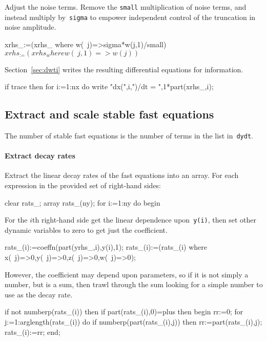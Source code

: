 \documentclass[11pt,a5paper]{article}
\begin{document}
Adjust the noise terms. Remove the \verb|small|
multiplication of noise terms, and instead multiply
by~\verb|sigma| to empower independent control of the
truncation in noise amplitude.
\begin{reduce}
xrhs_:=(xrhs_ where w(~j)=>sigma*w(j,1)/small)$
xrhs_:=(xrhs_ where w(~j,1)=>w(j))$
\end{reduce}

Section~\ref{sec:dwti} writes the resulting differential
equations for information.
\begin{reduce}
if trace then for i:=1:nx do 
    write "dx(",i,")/dt = ",1*part(xrhs_,i);
\end{reduce}


\subsection{Extract and scale stable fast equations}

The number of stable fast equations is the number of terms
in the list in~\verb|dydt|.

\paragraph{Extract decay rates}
Extract the linear decay rates of the fast equations into an
array. For each expression in the provided set of right-hand
sides:
\begin{reduce}
clear rats_; array rats_(ny);
for i:=1:ny do begin
\end{reduce}

For the $i$th right-hand side get the linear dependence
upon~\verb|y(i)|, then set other dynamic variables to zero
to get just the coefficient.
\begin{reduce}
  rats_(i):=coeffn(part(yrhs_,i),y(i),1);
  rats_(i):=(rats_(i) where 
      {x(~j)=>0,y(~j)=>0,z(~j)=>0,w(~j)=>0});
\end{reduce}

However, the coefficient may depend upon parameters, so if
it is not simply a number, but is a sum, then trawl through
the sum looking for a simple number to use as the decay
rate.
\begin{reduce}
  if not numberp(rats_(i)) then 
  if part(rats_(i),0)=plus then begin
    rr:=0;
    for j:=1:arglength(rats_(i)) do 
      if numberp(part(rats_(i),j)) 
      then rr:=part(rats_(i),j);
    rats_(i):=rr;
  end;
\end{reduce}
\end{document}
